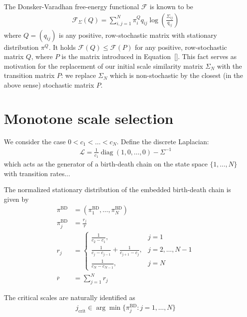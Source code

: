\begin{Rem}
    The Donsker-Varadhan free-energy functional $\mathcal{F}$ is known to be
    \begin{align*}
        \mathcal{F}_{\Sigma}(Q)=\sum_{i,j=1}^{N}\pi_i^{Q}q_{ij}\log{\left(\frac{\Sigma_{ij}}{q_{ij}}\right)}
    \end{align*}
    where $Q=(q_{ij})$ is any positive, row-stochastic matrix with stationary distribution $\pi^{Q}$. It holds $\mathcal{F}(Q)\le\mathcal{F}(P)$ for any positive, row-stochastic matrix $Q$, where $P$ is the matrix introduced in Equation~[]. This fact serves as motivation for the replacement of our initial scale similarity matrix $\Sigma_N$ with the transition matrix $P$: we replace $\Sigma_N$ which is non-stochastic by the closest (in the above sense) stochastic matrix $P$.
\end{Rem}

\section{Monotone scale selection}


We consider the case $0<c_1<\dots<c_N$. Define the discrete Laplacian:
\begin{align*}
    \mathcal{L}=\frac{1}{c_1}\operatorname{diag}(1,0,\dots,0)-\Sigma^{-1}
\end{align*}
which acts as the generator of a birth-death chain on the state space $\{1,\dots,N\}$ with transition rates...

The normalized stationary distribution of the embedded birth-death chain is given by
\begin{align*}
    \pi^{\text{BD}}&=(\pi^{\text{BD}}_1,\dots,\pi^{\text{BD}}_N)\\
    \pi^{\text{BD}}_j&=\frac{r_j}{\overline{r}}\\
    r_j&=\begin{cases}
        \frac{1}{c_2-c_1}, & j=1\\
        \frac{1}{c_j-c_{j-1}}+\frac{1}{c_{j+1}-{c_j}}, & j=2,\dots,N-1\\
        \frac{1}{c_N-c_{N-1}}, & j=N
    \end{cases}\\
    \overline{r}&=\sum_{j=1}^{N}r_j
\end{align*}

The critical scales are naturally identified as
\begin{align*}
    j_{\text{crit}}\in\arg\min\{\pi^{\text{BD}}_j:j=1,\dots,N\}
\end{align*}

